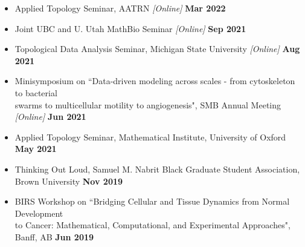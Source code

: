 \documentclass[margin,line]{res}
\begin{document}
\begin{resume}
{\begin{itemize}
\item[] Applied Topology Seminar, AATRN \textit{[Online]} \hfill {\bf \small Mar 2022}
\item[] Joint UBC and U. Utah MathBio Seminar \textit{[Online]} \hfill {\bf \small Sep 2021}
\item[] Topological Data Analysis Seminar, Michigan State University \textit{[Online]} \hfill {\bf \small Aug 2021}
\item[] Minisymposium on ``Data-driven modeling across scales - from cytoskeleton to bacterial\\ 
swarms to multicellular motility to angiogenesis", SMB Annual Meeting \textit{[Online]} \hfill {\bf \small Jun 2021}
\item[] Applied Topology Seminar, Mathematical Institute, University of Oxford \hfill {\bf \small May 2021}
\item[] Thinking Out Loud, Samuel M. Nabrit Black Graduate Student Association, \\ Brown University \hfill {\bf \small Nov 2019}
\item[] BIRS Workshop on ``Bridging Cellular and Tissue Dynamics from Normal Development\\ 
to Cancer: Mathematical, Computational, and Experimental Approaches", Banff, AB \hfill {\bf \small Jun 2019} 
\end{itemize}
}


\end{resume}
\end{document}
